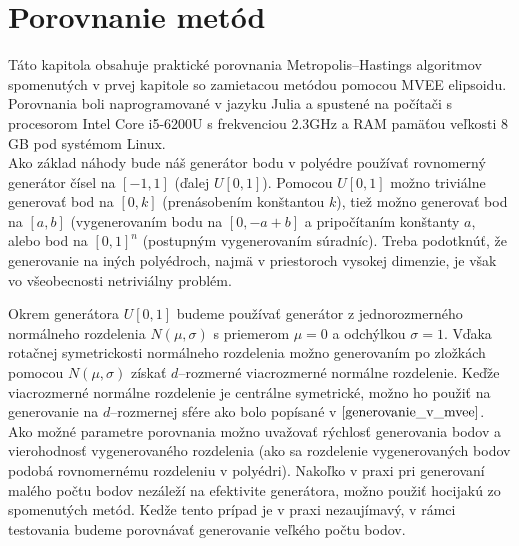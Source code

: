 \chapter{Porovnanie metód}

Táto kapitola obsahuje praktické porovnania Metropolis--Hastings algoritmov spomenutých v prvej kapitole so zamietacou metódou pomocou MVEE elipsoidu. Porovnania boli naprogramované v jazyku Julia a spustené na počítači s procesorom Intel Core i5-6200U s frekvenciou 2.3GHz a RAM pamäťou veľkosti 8 GB pod systémom Linux.\\

Ako základ náhody bude náš generátor bodu v polyédre používať rovnomerný generátor čísel na $[-1,1]$ (ďalej $U[0,1]$). Pomocou $U[0,1]$ možno triviálne generovať bod na $[0,k]$ (prenásobením konštantou $k$), tiež možno generovať bod na $[a,b]$ (vygenerovaním bodu na $[0, -a+b]$ a pripočítaním konštanty $a$, alebo bod na $[0,1]^n$ (postupným vygenerovaním súradníc). Treba podotknúť, že generovanie na iných polyédroch, najmä v priestoroch vysokej dimenzie, je však vo všeobecnosti netriviálny problém.

Okrem generátora $U[0,1]$ budeme používať generátor z jednorozmerného normálneho rozdelenia $N(\mu, \sigma)$ s priemerom $\mu=0$ a odchýlkou $\sigma=1$. Vďaka rotačnej symetrickosti normálneho rozdelenia možno generovaním po zložkách pomocou $N(\mu, \sigma)$ získať $d$--rozmerné viacrozmerné normálne rozdelenie.
Keďže viacrozmerné normálne rozdelenie je centrálne symetrické, možno ho použiť na generovanie na $d$--rozmernej sfére ako bolo popísané v $\ref{generovanie_v_mvee}$.\\

Ako možné parametre porovnania možno uvažovať rýchlosť generovania bodov a vierohodnosť vygenerovaného rozdelenia (ako sa rozdelenie vygenerovaných bodov podobá rovnomernému rozdeleniu v polyédri).
Nakoľko v praxi pri generovaní malého počtu bodov nezáleží na efektivite generátora, možno použiť hocijakú zo spomenutých metód. Kedže tento prípad je v praxi nezaujímavý, v rámci testovania budeme porovnávať generovanie veľkého počtu bodov.

